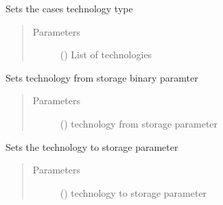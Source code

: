 \documentclass[a4paper,12pt,english]{article}
\begin{document}
\begin{fulllineitems}
\begin{fulllineitems}
\label{\detokenize{GOCPI:GOCPI.CreateCases.CreateCases.set_technology}}
Sets the cases technology type
\begin{quote}\begin{description}
\item[{Parameters}] \leavevmode
{} () \textendash{} List of technologies

\end{description}\end{quote}

\end{fulllineitems}


\begin{fulllineitems}
\label{\detokenize{GOCPI:GOCPI.CreateCases.CreateCases.set_technology_from_storage}}
Sets technology from storage binary paramter
\begin{quote}\begin{description}
\item[{Parameters}] \leavevmode
{} (\sphinxstyleliteralemphasis{\sphinxupquote{, }}) \textendash{} technology from storage parameter

\end{description}\end{quote}

\end{fulllineitems}


\begin{fulllineitems}
\label{\detokenize{GOCPI:GOCPI.CreateCases.CreateCases.set_technology_to_storage}}
Sets the technology to storage parameter
\begin{quote}\begin{description}
\item[{Parameters}] \leavevmode
{} (\sphinxstyleliteralemphasis{\sphinxupquote{, }}) \textendash{} technology to storage parameter


\end{description}
\end{quote}
\end{fulllineitems}
\end{fulllineitems}
\end{document}
